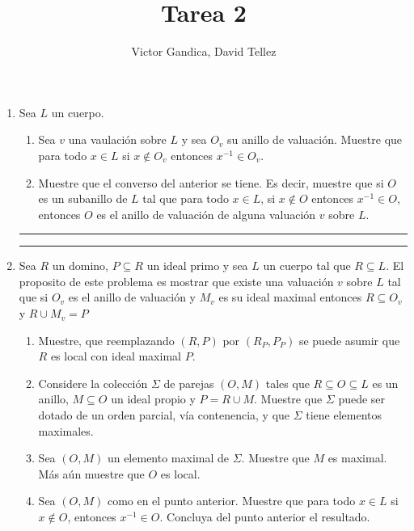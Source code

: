 \documentclass[spanish,a4paper,12pt]{article}
\title{Tarea 2}
\author{Victor Gandica, David Tellez}
\date{}
\begin{document}
\maketitle

\begin{enumerate}
  \item Sea $L$ un cuerpo. 
  \begin{enumerate}
    \item Sea $v$ una vaulación sobre $L$ y sea $O_v$ su anillo de valuación. Muestre que para todo $x \in L$ si $x \not\in O_v$ entonces $x^{-1} \in O_v$.
    \item Muestre que el converso del anterior se tiene. Es decir, muestre que si $O$ es un subanillo de $L$ tal que para todo $x \in L$, si $x \not \in O$ entonces $x^{-1} \in O$, entonces $O$ es el anillo de valuación de alguna valuación $v$ sobre $L$.
  \end{enumerate}

  \begin{center}
    \rule[2mm]{4.3cm}{0.5pt}
    \rule[2mm]{4.3cm}{0.5pt}
  \end{center}



  \item Sea $R$ un domino, $P \subseteq R$ un ideal primo y sea $L$ un cuerpo tal que $R \subseteq L$. El proposito de este problema es mostrar que existe una valuación $v$ sobre $L$ tal que si $O_v$ es el anillo de valuación y $M_v$ es su ideal maximal entonces $R \subseteq O_v$ y $R \cup M_v = P$
  
  \begin{enumerate}
    \item Muestre, que reemplazando $(R, P)$ por $(R_P , P_P)$ se puede asumir que $R$ es local con ideal maximal $P$.
    \item Considere la colección $\Sigma$ de parejas $(O, M)$ tales que $R \subseteq O \subseteq L$ es un anillo, $M \subseteq O$ un ideal propio y $P = R \cup M$. Muestre que $\Sigma$ puede ser dotado de un orden parcial, vía contenencia, y que $\Sigma$ tiene elementos maximales.
    \item Sea $(O, M)$ un elemento maximal de $\Sigma$. Muestre que $M$ es maximal. Más aún muestre que $O$ es local.
    \item Sea $(O, M)$ como en el punto anterior. Muestre que para todo $x \in L$ si $x \not \in O$, entonces $x^{-1} \in O$. Concluya del punto anterior el resultado.
  \end{enumerate}


\end{enumerate}
\end{document}
